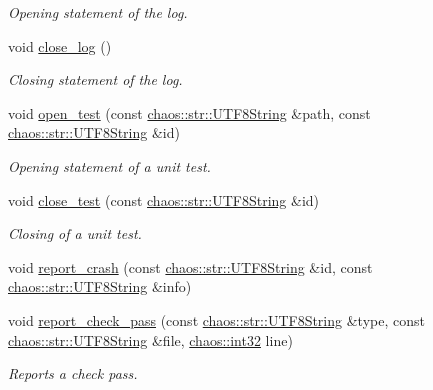 \begin{DoxyCompactItemize}
\begin{DoxyCompactList}\small\item\em Opening statement of the log. \end{DoxyCompactList}\item 
\hypertarget{classchaos_1_1test_1_1_test_logger_a3ba359890fa3daa7257657e6b3db4d90}{}void \hyperlink{classchaos_1_1test_1_1_test_logger_a3ba359890fa3daa7257657e6b3db4d90}{close\+\_\+log} ()\label{classchaos_1_1test_1_1_test_logger_a3ba359890fa3daa7257657e6b3db4d90}

\begin{DoxyCompactList}\small\item\em Closing statement of the log. \end{DoxyCompactList}\item 
void \hyperlink{classchaos_1_1test_1_1_test_logger_ac6744b59f304552bb819dd8f4d724143}{open\+\_\+test} (const \hyperlink{classchaos_1_1str_1_1_u_t_f8_string}{chaos\+::str\+::\+U\+T\+F8\+String} \&path, const \hyperlink{classchaos_1_1str_1_1_u_t_f8_string}{chaos\+::str\+::\+U\+T\+F8\+String} \&id)
\begin{DoxyCompactList}\small\item\em Opening statement of a unit test. \end{DoxyCompactList}\item 
void \hyperlink{classchaos_1_1test_1_1_test_logger_a5b1f6f1abbedaea7f5475e0dc2677c3c}{close\+\_\+test} (const \hyperlink{classchaos_1_1str_1_1_u_t_f8_string}{chaos\+::str\+::\+U\+T\+F8\+String} \&id)
\begin{DoxyCompactList}\small\item\em Closing of a unit test. \end{DoxyCompactList}\item 
void \hyperlink{classchaos_1_1test_1_1_test_logger_a8b1058208748869717c6771c733c3302}{report\+\_\+crash} (const \hyperlink{classchaos_1_1str_1_1_u_t_f8_string}{chaos\+::str\+::\+U\+T\+F8\+String} \&id, const \hyperlink{classchaos_1_1str_1_1_u_t_f8_string}{chaos\+::str\+::\+U\+T\+F8\+String} \&info)
\item 
void \hyperlink{classchaos_1_1test_1_1_test_logger_a90c861bc1dc931edc3f580d64898933c}{report\+\_\+check\+\_\+pass} (const \hyperlink{classchaos_1_1str_1_1_u_t_f8_string}{chaos\+::str\+::\+U\+T\+F8\+String} \&type, const \hyperlink{classchaos_1_1str_1_1_u_t_f8_string}{chaos\+::str\+::\+U\+T\+F8\+String} \&file, \hyperlink{namespacechaos_ad1de7efb430365afd2c9446a0f522a90}{chaos\+::int32} line)
\begin{DoxyCompactList}\small\item\em Reports a check pass. \end{DoxyCompactList}\item 

\end{DoxyCompactItemize}
